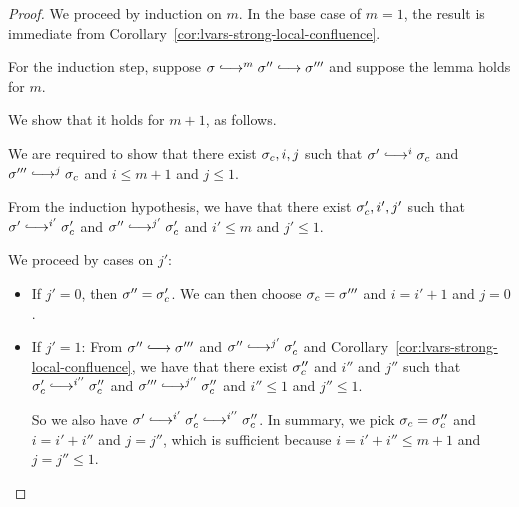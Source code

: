 \begin{proof}
  We proceed by induction on $m$.  In the base case of $m = 1$, the
  result is immediate from
  Corollary~\ref{cor:lvars-strong-local-confluence}.

  For the induction step, suppose $\conf \parstepsto^m \conf''
  \parstepsto \conf'''$ and suppose the lemma holds for $m$.

  We show that it holds for $m + 1$, as follows.

  We are required to show that there exist $\sigma_c, i, j$ such that
  $\conf' \parstepsto^{i} \conf_c$ and $\conf''' \parstepsto^{j}
  \conf_c$ and $i \leq m + 1$ and $j \leq 1$.

  From the induction hypothesis, we have that there exist $\sigma_c',
  i', j'$ such that $\conf' \parstepsto^{i'} \conf_c'$ and $\conf''
  \parstepsto^{j'} \conf_c'$ and $i' \leq m$ and $j' \leq 1$.

  We proceed by cases on $j'$:
  \begin{itemize}

  \item If $j' = 0$, then $\sigma'' = \sigma_c'$.  We can then
    choose $\sigma_c = \sigma'''$ and $i = i' + 1$ and $j = 0$.
    
  \item If $j' = 1$:
    From $\conf'' \parstepsto \conf'''$ and $\conf'' \parstepsto^{j'}
    \conf_c'$ and Corollary~\ref{cor:lvars-strong-local-confluence},
    we have that there exist $\sigma_c''$ and $i''$ and $j''$ such that
    $\conf'_c \parstepsto^{i''} \conf_c''$ and $\conf'''
    \parstepsto^{j''} \conf_c''$ and $i'' \leq 1$ and $j'' \leq 1$.

    So we also have $\conf' \parstepsto^{i'} \conf_c'
    \parstepsto^{i''} \conf_c''$.  In summary, we pick $\sigma_c =
    \sigma_c''$ and $i = i' + i''$ and $j = j''$, which is sufficient
    because $i = i' + i'' \leq m + 1$ and $j = j'' \leq 1$.
  \end{itemize}

 \end{proof}
